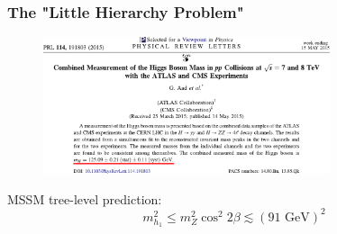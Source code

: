 \documentclass[10pt,aspectratio=169]{beamer}
\begin{document}
\begin{frame}
  \frametitle{The "Little Hierarchy Problem"}
   \begin{figure}
      \includegraphics[width=0.75\textwidth]{higgs_mass_prl}
    \end{figure}
    \begin{center}
      MSSM tree-level prediction:
    \begin{equation*}
      m_{h_1}^2 \leq m_Z^2 \cos^2 2\beta \lesssim (91 \text{ GeV})^2
   \end{equation*}
 \end{center}
\end{frame}
\end{document}
